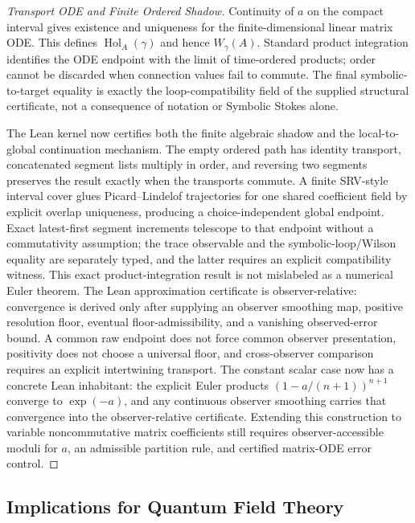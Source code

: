 \begin{proof}[Transport ODE and Finite Ordered Shadow]
\label{proof:bk4_wilson_loop}
Continuity of $a$ on the compact interval gives existence and uniqueness for
the finite-dimensional linear matrix ODE.  This defines
$\operatorname{Hol}_A(\gamma)$ and hence $W_\gamma(A)$.  Standard product
integration identifies the ODE endpoint with the limit of time-ordered products;
order cannot be discarded when connection values fail to commute.  The final
symbolic-to-target equality is exactly the loop-compatibility field of the
supplied structural certificate, not a consequence of notation or Symbolic
Stokes alone.

The Lean kernel now certifies both the finite algebraic shadow and the local-to-global continuation mechanism. The empty ordered path has identity transport, concatenated segment lists multiply in order, and reversing two segments preserves the result exactly when the transports commute. A finite SRV-style interval cover glues Picard--Lindelof trajectories for one shared coefficient field by explicit overlap uniqueness, producing a choice-independent global endpoint. Exact latest-first segment increments telescope to that endpoint without a commutativity assumption; the trace observable and the symbolic-loop/Wilson equality are separately typed, and the latter requires an explicit compatibility witness. This exact product-integration result is not mislabeled as a numerical Euler theorem. The Lean approximation certificate is observer-relative: convergence is derived only after supplying an observer smoothing map, positive resolution floor, eventual floor-admissibility, and a vanishing observed-error bound. A common raw endpoint does not force common observer presentation, positivity does not choose a universal floor, and cross-observer comparison requires an explicit intertwining transport. The constant scalar case now has a concrete Lean inhabitant: the explicit Euler products $(1-a/(n+1))^{n+1}$ converge to $\exp(-a)$, and any continuous observer smoothing carries that convergence into the observer-relative certificate. Extending this construction to variable noncommutative matrix coefficients still requires observer-accessible moduli for $a$, an admissible partition rule, and certified matrix-ODE error control.
\end{proof}

\subsection{Implications for Quantum Field Theory}
\label{subsec:bk4_implications_for_quantum_field_theory}

